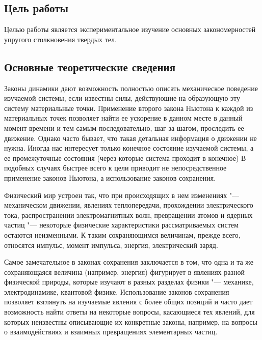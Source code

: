 \documentclass[a4paper, 12pt]{extarticle}
\begin{document}
\MTDTitlePage
\MTDInfoPage

\setcounter{section}{4}

\subsection{Цель работы}
Целью работы является экспериментальное изучение основных закономерностей упругого столкновения твердых тел.

\subsection{Основные теоретические сведения}

Законы динамики дают возможность полностью описать механическое поведение изучаемой системы, если известны силы, действующие на образующую эту систему материальные точки. Применение второго закона Ньютона к каждой из материальных точек позволяет найти ее ускорение в данном месте в данный момент времени и тем самым последовательно, шаг за шагом, проследить ее движение. Однако часто бывает, что такая детальная информация о движении не нужна.
Иногда нас интересует только конечное состояние изучаемой системы, а ее промежуточные состояния (через которые система проходит в конечное) %
В подобных случаях быстрее всего к цели приводит не непосредственное применение законов Ньютона, а использование законов сохранения.

Физический мир устроен так, что при происходящих в нем изменениях "--- механическом движении, явлениях теплопередачи, прохождении электрического тока, распространении электромагнитных волн, превращении атомов и ядерных частиц "--- некоторые физические характеристики рассматриваемых систем остаются неизменными. К таким сохраняющимся величинам, прежде всего, относятся импульс, момент импульса, энергия, электрический заряд.

 Самое замечательное в законах сохранения заключается в том, что одна и та же сохраняющаяся величина (например, энергия)  %
 фигурирует в явлениях разной физической природы, которые изучают в разных разделах физики "--- механике, электродинамике, квантовой физике. Использование законов сохранения позволяет взглянуть на изучаемые явления с более общих позиций и часто дает возможность найти ответы на некоторые вопросы, касающиеся тех явлений, для которых %
 неизвестны описывающие их конкретные законы, например, на вопросы о взаимодействиях и взаимных превращениях элементарных частиц. %
\end{document}
